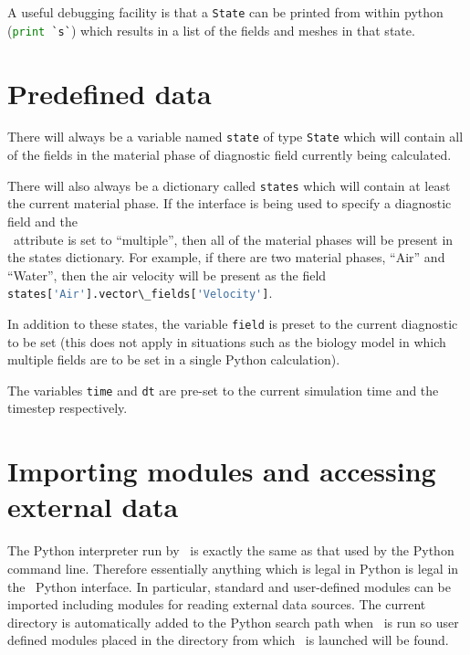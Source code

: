 A useful debugging facility is that a \lstinline[language=Python]+State+ can
be printed from within python (\lstinline[language=Python]+print `s`+) which
results in a list of the fields and meshes in that state.

\section{Predefined data}

 There will always be a variable named
\lstinline[language=Python]+state+ of type
\lstinline[language=Python]+State+ which will contain all of the fields in
the material phase of diagnostic field currently being calculated.

There will also always be a dictionary called \lstinline[language=Python]+states+
which will contain at least the current material phase. If the interface is
being used to specify a diagnostic field and the\\
\ attribute is set to
``multiple'', then all of the material phases will be present in the
states dictionary. For example, if there are two material phases, ``Air''
and ``Water'', then the air velocity will be present as the field\\
\lstinline[language=Python]+states['Air'].vector\_fields['Velocity']+. 

In addition to these states, the variable \lstinline[language=Python]+field+
is preset to the current diagnostic to be set (this does not apply in
situations such as the biology model in which multiple fields are to be set
in a single Python calculation). 

The variables \lstinline[language=Python]+time+ and
\lstinline[language=Python]+dt+ are pre-set to the current simulation time
and the timestep respectively.

\section{Importing modules and accessing external data}

The Python interpreter run by \fluidity\ is exactly the same as that used by
the Python command line. Therefore essentially anything which is legal in
Python is legal in the \fluidity\ Python interface. In particular, standard
and user-defined modules can be imported including modules for reading
external data sources. The current directory is automatically added to the
Python search path when \fluidity\ is run so user defined modules placed in
the directory from which \fluidity\ is launched will be found.

